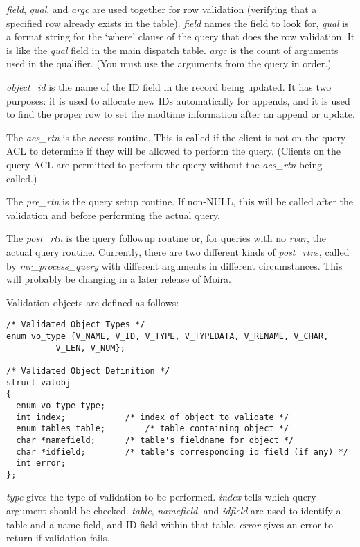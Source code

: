 {\it field}, {\it qual}, and {\it argc\/} are used together for row
validation (verifying that a specified row already exists in the
table). {\it field\/} names the field to look for, {\it qual\/} is a
format string for the `where' clause of the query that does the row
validation. It is like the {\it qual\/} field in the main dispatch
table. {\it argc\/} is the count of arguments used in the qualifier.
(You must use the arguments from the query in order.)

{\it object\_id\/} is the name of the ID field in the record being updated.
It has two purposes:  it is used to allocate new IDs automatically
for appends, and it is used to find the proper row to set the modtime
information after an append or update.

The {\it acs\_rtn\/} is the access routine. This is called if the
client is not on the query ACL to determine if they will be allowed to
perform the query. (Clients on the query ACL are permitted to perform
the query without the {\it acs\_rtn\/} being called.)

The {\it pre\_rtn\/} is the query setup routine. If non-NULL, this
will be called after the validation and before performing the actual
query.

The {\it post\_rtn\/} is the query followup routine or, for queries
with no {\it rvar\/}, the actual query routine. Currently, there are
two different kinds of {\it post\_rtn\/}s, called by {\it
mr\_process\_query} with different arguments in different
circumstances. This will probably be changing in a later release of
Moira.

\noindent Validation objects are defined as follows:

\begin{verbatim}
/* Validated Object Types */
enum vo_type {V_NAME, V_ID, V_TYPE, V_TYPEDATA, V_RENAME, V_CHAR,
	      V_LEN, V_NUM};

/* Validated Object Definition */
struct valobj
{
  enum vo_type type;
  int index;			/* index of object to validate */
  enum tables table;     	/* table containing object */
  char *namefield;		/* table's fieldname for object */
  char *idfield;		/* table's corresponding id field (if any) */
  int error;
};
\end{verbatim}

{\it type\/} gives the type of validation to be performed. {\it
index\/} tells which query argument should be checked. {\it table},
{\it namefield}, and {\it idfield\/} are used to identify a table and
a name field, and ID field within that table. {\it error\/} gives an
error to return if validation fails.

